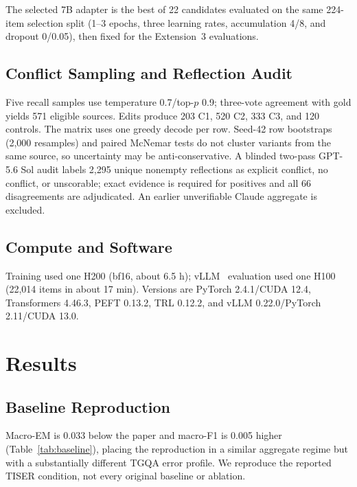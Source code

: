 \documentclass[conference]{IEEEtran}
\begin{document}
The selected 7B adapter is the best of 22 candidates evaluated on the same 224-item selection split (1--3 epochs, three learning rates, accumulation 4/8, and dropout 0/0.05), then fixed for the Extension~3 evaluations.

\subsection{Conflict Sampling and Reflection Audit}

Five recall samples use temperature 0.7/top-$p$ 0.9; three-vote agreement with gold yields 571 eligible sources. Edits produce 203 C1, 520 C2, 333 C3, and 120 controls. The matrix uses one greedy decode per row. Seed-42 row bootstraps (2,000 resamples) and paired McNemar tests do not cluster variants from the same source, so uncertainty may be anti-conservative. A blinded two-pass GPT-5.6 Sol audit labels 2,295 unique nonempty reflections as explicit conflict, no conflict, or unscorable; exact evidence is required for positives and all 66 disagreements are adjudicated. An earlier unverifiable Claude aggregate is excluded.

\subsection{Compute and Software}

Training used one H200 (bf16, about 6.5 h); vLLM~\cite{kwon2023vllm} evaluation used one H100 (22,014 items in about 17 min). Versions are PyTorch 2.4.1/CUDA 12.4, Transformers 4.46.3, PEFT 0.13.2, TRL 0.12.2, and vLLM 0.22.0/PyTorch 2.11/CUDA 13.0.

\section{Results}

\subsection{Baseline Reproduction}

Macro-EM is 0.033 below the paper and macro-F1 is 0.005 higher (Table~\ref{tab:baseline}), placing the reproduction in a similar aggregate regime but with a substantially different TGQA error profile. We reproduce the reported TISER condition, not every original baseline or ablation.
\end{document}
